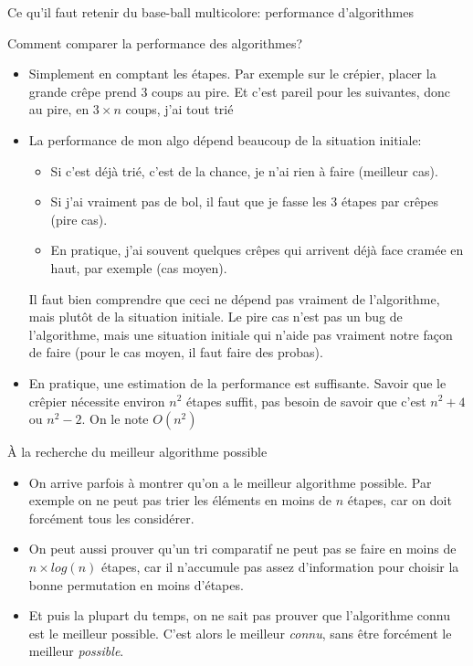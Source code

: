 \documentclass[final,hyperref={pdfpagelabels=false}]{beamer}
\begin{document}
\begin{frame}{Ce qu'il faut retenir du base-ball multicolore: performance d'algorithmes}
  \begin{block}{Comment comparer la performance des algorithmes?}
    \begin{itemize}
    \item Simplement en comptant les étapes. Par exemple sur le crépier, placer
      la grande crêpe prend 3 coups au pire. Et c'est pareil pour les
      suivantes, donc au pire, en $3\times n$ coups, j'ai tout trié
    \item La performance de mon algo dépend beaucoup de la situation initiale:
      \begin{itemize}
      \item Si c'est déjà trié, c'est de la chance, je n'ai rien à faire
        (\alert{meilleur cas}).
      \item Si j'ai vraiment pas de bol, il faut que je fasse les 3 étapes par
        crêpes (\alert{pire cas}).
      \item En pratique, j'ai souvent quelques crêpes qui arrivent déjà face
        cramée en haut, par exemple (\alert{cas moyen}).
      \end{itemize}
      Il faut bien comprendre que ceci ne dépend pas vraiment de l'algorithme,
      mais plutôt de la situation initiale. Le pire cas n'est pas un bug de
      l'algorithme, mais une situation initiale qui n'aide pas vraiment notre
      façon de faire (pour le cas moyen, il faut faire des probas).
    \item En pratique, une estimation de la performance est suffisante. Savoir
      que le crêpier nécessite environ $n^2$ étapes suffit, pas besoin de
      savoir que c'est $n^2+4$ ou $n^2-2$. On le note $O(n^2)$      
    \end{itemize}
  \end{block}

  \begin{block}{À la recherche du meilleur algorithme possible}
    \begin{itemize}
    \item On arrive parfois à montrer qu'on a le meilleur algorithme
      possible. Par exemple on ne peut pas trier les éléments en moins de $n$
      étapes, car on doit forcément tous les considérer.
    \item On peut aussi prouver qu'un tri comparatif ne peut pas se faire en
      moins de $n\times log(n)$ étapes, car il n'accumule pas assez
      d'information pour choisir la bonne permutation en moins d'étapes.
    \item Et puis la plupart du temps, on ne sait pas prouver que l'algorithme
      connu est le meilleur possible.  C'est alors le meilleur \textit{connu},
      sans être forcément le meilleur \textit{possible}.
    \end{itemize}
  \end{block}


\end{frame}
\end{document}
